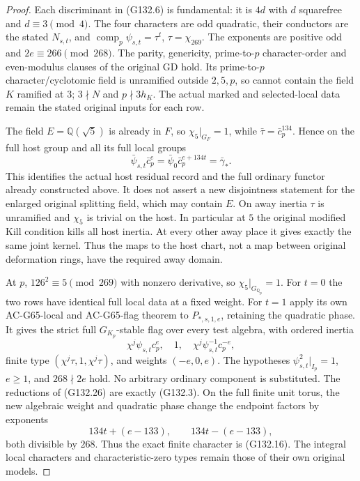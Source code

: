 \begin{proof}
Each discriminant in (G132.6) is fundamental:
it is \(4d\) with \(d\) squarefree and \(d\equiv3\pmod4\).
The four characters are odd quadratic, their conductors
are the stated \(N_{s,t}\), and
\(\operatorname{comp}_p\psi_{s,t}=\tau^t\), \(\tau=\chi_{269}\).
The exponents are positive odd and
\(2e\equiv266\pmod{268}\).
The parity, genericity, prime-to-\(p\) character-order
and even-modulus clauses of the original GD hold.
Its prime-to-\(p\) character/cyclotomic field is
unramified outside \(2,5,p\), so cannot contain
the field \(K\) ramified at \(3\); \(3\nmid N\) and
\(p\nmid3h_K\).  The actual marked and selected-local
data remain the stated original inputs for each row.

The field \(E=\mathbb Q(\sqrt5)\) is already in \(F\),
so \(\chi_5|_{G_F}=1\), while
\(\bar\tau=\bar c_p^{134}\).  Hence on the full host
group and all its full local groups
\[
 \bar\psi_{s,t}\bar c_p^{e}
       =\bar\psi_0\bar c_p^{e+134t}
       =\bar\gamma_* .
 \tag{G132.25}
\]
This identifies the actual host residual record and
the full ordinary functor already constructed above.
It does not assert a new disjointness statement for
the enlarged original splitting field, which may
contain \(E\).
On away inertia \(\tau\) is unramified and \(\chi_5\)
is trivial on the host.  In particular at \(5\) the
original modified Kill condition kills all host
inertia.  At every other away place it gives exactly
the same joint kernel.  Thus the maps to the host
chart, not a map between original deformation rings,
have the required away domain.

At \(p\), \(126^2\equiv5\pmod{269}\) with nonzero
derivative, so \(\chi_5|_{G_{\mathbb Q_p}}=1\).
For \(t=0\) the two rows have identical full local
data at a fixed weight.  For \(t=1\) apply its own
AC-G65-local and AC-G65-flag theorem to
\(P_{*,s,1,e}\), retaining the quadratic phase.
It gives the strict full \(G_{K_p}\)-stable flag
over every test algebra, with ordered inertia
\[
 \chi^j\psi_{s,t}c_p^e,\quad1,\quad
                      \chi^j\psi_{s,t}^{-1}c_p^{-e},
 \tag{G132.26}
\]
finite type \((\chi^j\tau,1,\chi^j\tau)\), and
weights \((-e,0,e)\).
The hypotheses \(\psi_{s,t}^2|_{I_p}=1\), \(e\ge1\),
and \(268\nmid2e\) hold.  No arbitrary ordinary
component is substituted.
The reductions of (G132.26) are exactly (G132.3).
On the full finite unit torus, the new algebraic
weight and quadratic phase change the endpoint
factors by exponents
\[
                  134t+(e-133),\qquad134t-(e-133),
 \tag{G132.27}
\]
both divisible by \(268\).
Thus the exact finite character is (G132.16).
The integral local characters and characteristic-zero
types remain those of their own original models.


\end{proof}
